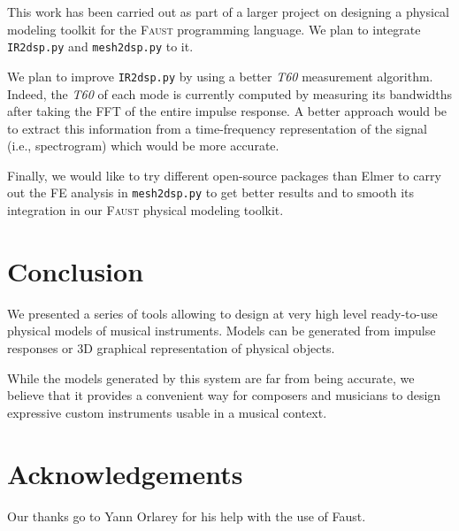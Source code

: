 \documentclass[11pt,a4paper]{article}
\newcommand{\f}{\textsc{Faust}}
\begin{document}
This work has been carried out as part of a larger project on designing a physical modeling toolkit for the \f{} programming language. We plan to integrate \texttt{IR2dsp.py} and \texttt{mesh2dsp.py} to it.

We plan to improve \texttt{IR2dsp.py} by using a better \textit{T60} measurement algorithm. Indeed, the \textit{T60} of each mode is currently computed by measuring its bandwidths after taking the FFT of the entire impulse response. A better approach would be to extract this information from a time-frequency representation of the signal (i.e., spectrogram) which would be more accurate.

Finally, we would like to try different open-source packages than Elmer to carry out the FE analysis in \texttt{mesh2dsp.py} to get better results and to smooth its integration in our \f{} physical modeling toolkit.  

\section{Conclusion}

We presented a series of tools allowing to design at very high level ready-to-use physical models of musical instruments. Models can be generated from impulse responses or 3D graphical representation of physical objects.

While the models generated by this system are far from being accurate, we believe that it provides a convenient way for composers and musicians to design expressive custom instruments usable in a musical context.  


\section{Acknowledgements}

Our thanks go to Yann Orlarey for his help with the use of Faust.



\end{document}
